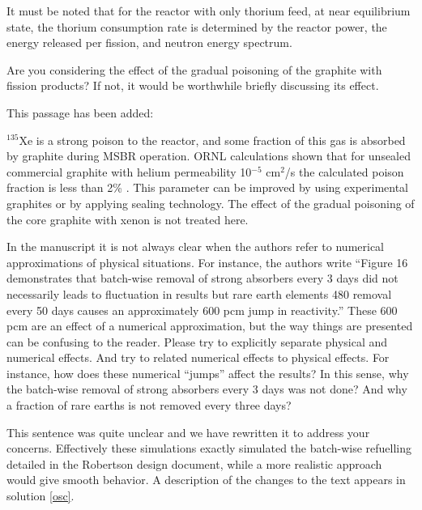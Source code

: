 \documentclass[answers,11pt]{exam}
\begin{document}
\begin{questions}
\begin{solution}
                It must be noted that for the reactor with only thorium feed, 
                at near equilibrium state, the thorium consumption rate is 
				determined by the reactor power, the energy released per fission, 
				and neutron energy spectrum.
        \end{solution}


        \question Are you considering the effect of the gradual poisoning of 
        the graphite with fission products? If not, it would be worthwhile 
        briefly discussing its effect.
        \begin{solution}
                This passage has been added:
				
				$^{135}$Xe is a strong poison to the reactor, and some 
				fraction of this gas is absorbed by graphite during MSBR
				operation. ORNL calculations shown that for unsealed commercial 
				graphite with helium permeability 10$^{-5}$ cm$^2$/s the 
				calculated poison fraction is less than 2\% \cite{robertson_conceptual_1971}. 
				This parameter can be improved by using experimental graphites 
				or by applying sealing technology. The effect of the gradual 
				poisoning of the core graphite with xenon is not treated here.
        \end{solution}


        \question In the manuscript it is not always clear when the authors 
        refer to numerical approximations of physical situations. For instance, 
        the authors write ``Figure 16 demonstrates that batch-wise removal of 
        strong absorbers every 3 days did not necessarily leads to fluctuation 
        in results but rare earth elements 480 removal every 50 days causes an 
        approximately 600 pcm jump in reactivity.'' These 600 pcm are an effect 
        of a numerical approximation, but the way things are presented can be 
        confusing to the reader. Please try to explicitly separate physical and 
        numerical effects. And try to related numerical effects to physical 
        effects. For instance, how does these numerical ``jumps'' affect the 
        results?  In this sense, why the batch-wise removal of strong absorbers 
        every 3 days  was not done? And why a fraction of rare earths  is not 
        removed every three days?
        \begin{solution}
                This sentence was quite unclear and we have rewritten it to 
                address your concerns. Effectively these simulations exactly 
                simulated the batch-wise refuelling detailed in the Robertson 
                design document, while a more realistic approach would give 
                smooth behavior. A description of the changes to the text 
                appears in solution \ref{osc}.
        \end{solution}


\end{questions}
\end{document}
